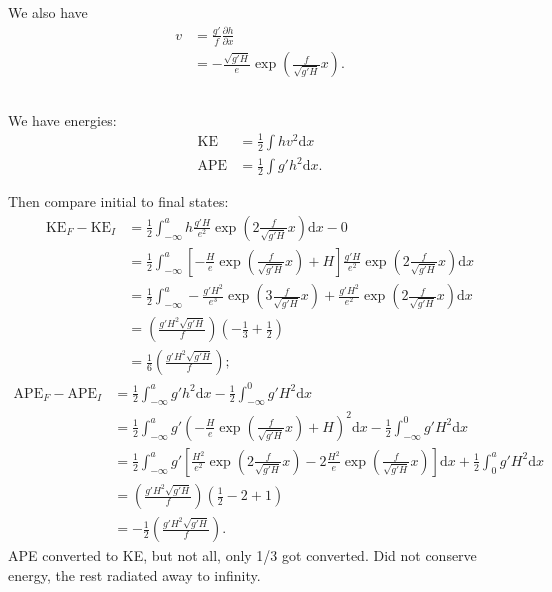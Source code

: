 \documentclass[11pt,letterpaper]{book}
\theoremstyle{definition}
\newcommand{\de}{\mathrm{d}}
\newcommand{\pe}{\partial}
\newcommand{\APE}{\text{APE}}
\newcommand{\KE}{\text{KE}}
\begin{document}
We also have
\begin{align*}
    v &= \frac{g'}{f}\frac{\pe h}{\pe x}\\
    &= -\frac{\sqrt{g'H}}{e}\exp\left(\frac{f}{\sqrt{g'H}}x\right).
\end{align*}

\subsection{}
We have energies:
\begin{align*}
\KE &= \frac{1}{2}\int hv^2 \de x\\
\APE &= \frac{1}{2}\int g'h^2\de x.
\end{align*}

Then compare initial to final states:
\begin{align*}
    \KE_F-\KE_I &= \frac{1}{2}\int^a_{-\infty} h\frac{{g'H}}{e^2}\exp\left(2\frac{f}{\sqrt{g'H}}x\right) \de x-0\\
    &= \frac{1}{2}\int^a_{-\infty} \left[-\frac{H}{e}\exp\left(\frac{f}{\sqrt{g'H}}x\right)+H\right]\frac{{g'H}}{e^2}\exp\left(2\frac{f}{\sqrt{g'H}}x\right) \de x\\
    &= \frac{1}{2}\int^a_{-\infty} -\frac{g'H^2}{e^3}\exp\left(3\frac{f}{\sqrt{g'H}}x\right)+\frac{{g'H^2}}{e^2}\exp\left(2\frac{f}{\sqrt{g'H}}x\right)\de x\\
    &= \left(\frac{g'H^2\sqrt{g'H}}{f}\right)\left(-\frac{1}{3}+\frac{1}{2}\right)\\
    &= \frac{1}{6}\left(\frac{g'H^2\sqrt{g'H}}{f}\right);
\end{align*}
\begin{align*}
    \APE_F-\APE_I &= \frac{1}{2}\int^a_{-\infty} g'h^2\de x-\frac{1}{2}\int^0_{-\infty} g'H^2\de x\\
    &= \frac{1}{2}\int^a_{-\infty} g'\left(-\frac{H}{e}\exp\left(\frac{f}{\sqrt{g'H}}x\right)+H\right)^2\de x-\frac{1}{2}\int^0_{-\infty} g'H^2\de x\\
    &= \frac{1}{2}\int^a_{-\infty} g'\left[\frac{H^2}{e^2}\exp\left(2\frac{f}{\sqrt{g'H}}x\right)-2\frac{H^2}{e}\exp\left(\frac{f}{\sqrt{g'H}}x\right)\right]\de x+\frac{1}{2}\int^a_0 g'H^2\de x\\
    &= \left(\frac{g'H^2\sqrt{g'H}}{f}\right)\left(\frac{1}{2}-2+1\right)\\
    &= -\frac{1}{2}\left(\frac{g'H^2\sqrt{g'H}}{f}\right).
\end{align*}
APE converted to KE, but not all, only 1/3 got converted. Did not conserve energy, the rest radiated away to infinity.
\end{document}
